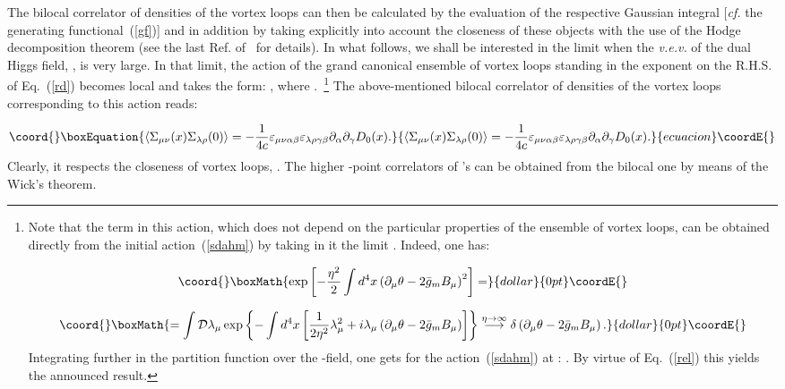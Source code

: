 \documentclass[a4paper,12pt]{article}
\begin{document}
The bilocal correlator of densities of the vortex loops can then be calculated by the evaluation of the 
respective Gaussian integral [{\it cf.} the generating functional~(\ref{gf})] and in addition by 
taking explicitly into account the closeness of these objects with the use of 
the Hodge decomposition theorem (see the last Ref. of~\cite{ijmpa} for details). In what follows,
we shall be interested in the limit when the {\it v.e.v.} of the dual Higgs field, \myHighlight{$\eta$}\coordHE{},
is very large. In that limit, the action of the grand canonical ensemble of vortex loops
standing in the exponent on the R.H.S. of Eq.~(\ref{rd}) becomes local and takes the form:
\coordHE{}, where \coordHE{}.~\footnote{Note that 
the term \coordHE{} in this action, which does not depend on the particular properties
of the ensemble of vortex loops, can be obtained directly from the initial action~(\ref{sdahm}) by taking
in it the limit \myHighlight{$\eta\to\infty$}\coordHE{}. Indeed, one has:

$$\coord{}\boxMath{
\exp\left[-\frac{\eta^2}{2}\int d^4x\left(\partial_\mu\theta-2\bar g_mB_\mu\right)^2\right]=}{dollar}{0pt}\coordE{}$$

$$\coord{}\boxMath{
=\int {\cal D}\lambda_\mu\exp\left\{-\int d^4x\left[\frac{1}{2\eta^2}\lambda_\mu^2+i\lambda_\mu
\left(\partial_\mu\theta-2\bar g_mB_\mu\right)\right]\right\}
\stackrel{\eta\to\infty}{\longrightarrow}\delta\left(\partial_\mu\theta-2\bar g_mB_\mu\right).}{dollar}{0pt}\coordE{}$$
Integrating further in the partition function over the \coordHE{}-field, one gets for the action~(\ref{sdahm}) 
at \myHighlight{$\eta\to\infty$}\coordHE{}: \coordHE{}.  
By virtue of Eq.~(\ref{rel}) this yields the announced result.}
The above-mentioned bilocal correlator of densities of the vortex loops corresponding to this action reads:

\begin{equation}\coord{}\boxEquation{
\label{SigSig}
\left<\Sigma_{\mu\nu}(x)\Sigma_{\lambda\rho}(0)\right>=-\frac{1}{4c}\varepsilon_{\mu\nu\alpha\beta}
\varepsilon_{\lambda\rho\gamma\beta}\partial_\alpha\partial_\gamma D_0(x).
}{
\left<\Sigma_{\mu\nu}(x)\Sigma_{\lambda\rho}(0)\right>=-\frac{1}{4c}\varepsilon_{\mu\nu\alpha\beta}
\varepsilon_{\lambda\rho\gamma\beta}\partial_\alpha\partial_\gamma D_0(x).
}{ecuacion}\coordE{}\end{equation}
Clearly, it respects the closeness of vortex loops, \coordHE{}. 
The higher \coordHE{}-point correlators
of \myHighlight{$\Sigma_{\mu\nu}$}\coordHE{}'s can be obtained from the bilocal one by means of the Wick's theorem. 
\end{document}
